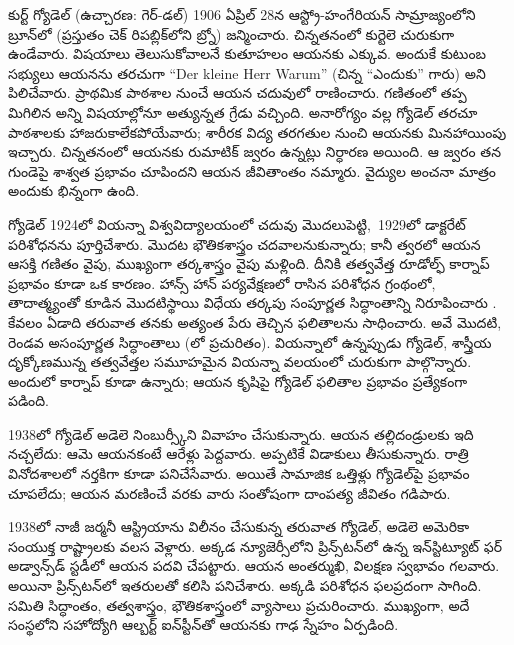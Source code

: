\documentclass[../../../include/open-logic-section]{subfiles}
\begin{document}



కుర్ట్ గ్యోడెల్ (ఉచ్చారణ: గెర్-డల్) 1906 ఏప్రిల్ 28న ఆస్ట్రో-హంగేరియన్ సామ్రాజ్యంలోని బ్రూన్‌లో (ప్రస్తుతం చెక్ రిపబ్లిక్‌లోని బ్ర్నో) జన్మించారు. చిన్నతనంలో కుర్టెలె చురుకుగా ఉండేవారు. విషయాలు తెలుసుకోవాలనే కుతూహలం ఆయనకు ఎక్కువ. అందుకే కుటుంబ సభ్యులు ఆయనను తరచుగా ``Der kleine Herr Warum'' (చిన్న ``ఎందుకు'' గారు) అని పిలిచేవారు. ప్రాథమిక పాఠశాల నుంచే ఆయన చదువులో రాణించారు. గణితంలో తప్ప మిగిలిన అన్ని విషయాల్లోనూ అత్యున్నత గ్రేడు వచ్చింది. అనారోగ్యం వల్ల గ్యోడెల్ తరచూ పాఠశాలకు హాజరుకాలేకపోయేవారు; శారీరక విద్య తరగతుల నుంచి ఆయనకు మినహాయింపు ఇచ్చారు. చిన్నతనంలో ఆయనకు రుమాటిక్ జ్వరం ఉన్నట్లు నిర్ధారణ అయింది. ఆ జ్వరం తన గుండెపై శాశ్వత ప్రభావం చూపిందని ఆయన
జీవితాంతం నమ్మారు. వైద్యుల అంచనా మాత్రం అందుకు భిన్నంగా ఉంది.

గ్యోడెల్ 1924లో వియన్నా విశ్వవిద్యాలయంలో చదువు మొదలుపెట్టి,~1929లో డాక్టరేట్ పరిశోధనను పూర్తిచేశారు. మొదట భౌతికశాస్త్రం చదవాలనుకున్నారు; కానీ త్వరలో ఆయన ఆసక్తి గణితం వైపు, ముఖ్యంగా తర్కశాస్త్రం వైపు మళ్లింది. దీనికి తత్వవేత్త రూడోల్ఫ్ కార్నాప్ ప్రభావం కూడా ఒక కారణం. హాన్స్ హాన్ పర్యవేక్షణలో రాసిన పరిశోధన గ్రంథంలో, తాదాత్మ్యంతో
కూడిన మొదటిస్థాయి విధేయ తర్కపు సంపూర్ణత సిద్ధాంతాన్ని నిరూపించారు \citep{Godel1929}. కేవలం ఏడాది తరువాత తనకు అత్యంత పేరు తెచ్చిన ఫలితాలను సాధించారు. అవే మొదటి, రెండవ అసంపూర్ణత సిద్ధాంతాలు (\citealt{Godel1931}లో ప్రచురితం). వియన్నాలో ఉన్నప్పుడు గ్యోడెల్, శాస్త్రీయ దృక్కోణమున్న తత్వవేత్తల సమూహమైన వియన్నా వలయంలో చురుకుగా పాల్గొన్నారు. అందులో కార్నాప్ కూడా ఉన్నారు; ఆయన కృషిపై గ్యోడెల్ ఫలితాల ప్రభావం ప్రత్యేకంగా పడింది.

1938లో గ్యోడెల్ అడెలె నింబుర్స్కీని వివాహం చేసుకున్నారు. ఆయన తల్లిదండ్రులకు ఇది నచ్చలేదు: ఆమె ఆయనకంటే ఆరేళ్లు పెద్దవారు. అప్పటికే విడాకులు తీసుకున్నారు.
రాత్రి వినోదశాలలో నర్తకిగా కూడా పనిచేసేవారు. అయితే సామాజిక ఒత్తిళ్లు గ్యోడెల్‌పై ప్రభావం చూపలేదు; ఆయన మరణించే వరకు వారు సంతోషంగా దాంపత్య జీవితం గడిపారు.

1938లో నాజీ జర్మనీ ఆస్ట్రియాను విలీనం చేసుకున్న తరువాత గ్యోడెల్, అడెలె అమెరికా సంయుక్త రాష్ట్రాలకు వలస వెళ్లారు. అక్కడ న్యూజెర్సీలోని ప్రిన్స్‌టన్‌లో ఉన్న ఇన్‌స్టిట్యూట్ ఫర్ అడ్వాన్స్‌డ్ స్టడీలో ఆయన పదవి చేపట్టారు. ఆయన అంతర్ముఖి, విలక్షణ స్వభావం గలవారు. అయినా
ప్రిన్స్‌టన్‌లో ఇతరులతో కలిసి పనిచేశారు. అక్కడి పరిశోధన
ఫలప్రదంగా సాగింది. సమితి సిద్ధాంతం, తత్వశాస్త్రం, భౌతికశాస్త్రంలో వ్యాసాలు ప్రచురించారు. ముఖ్యంగా, అదే సంస్థలోని సహోద్యోగి ఆల్బర్ట్ ఐన్‌స్టీన్‌తో ఆయనకు గాఢ స్నేహం ఏర్పడింది.
\end{document}
